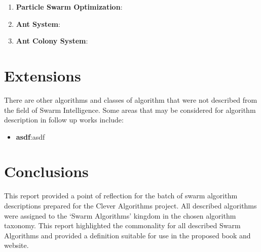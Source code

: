 \documentclass[a4paper, 11pt]{article}
\begin{document}
\begin{enumerate}
	\item \textbf{Particle Swarm Optimization}: \cite{Brownlee2010ac}
	\item \textbf{Ant System}: \cite{Brownlee2010ad}
	\item \textbf{Ant Colony System}: \cite{Brownlee2010ae}
\end{enumerate}

% 
% 
\section{Extensions}
\label{sec:extensions}
There are other algorithms and classes of algorithm that were not described from the field of Swarm Intelligence. Some areas that may be considered for algorithm description in follow up works include:

\begin{itemize}
	\item \textbf{asdf}:asdf
\end{itemize}

% 
% 
\section{Conclusions}
\label{sec:conclusions}
This report provided a point of reflection for the batch of swarm algorithm descriptions prepared for the Clever Algorithms project. All described algorithms were assigned to the `Swarm Algorithms' kingdom in the chosen algorithm taxonomy. This report highlighted the commonality for all described Swarm Algorithms and provided a definition suitable for use in the proposed book and website.



\end{document}
